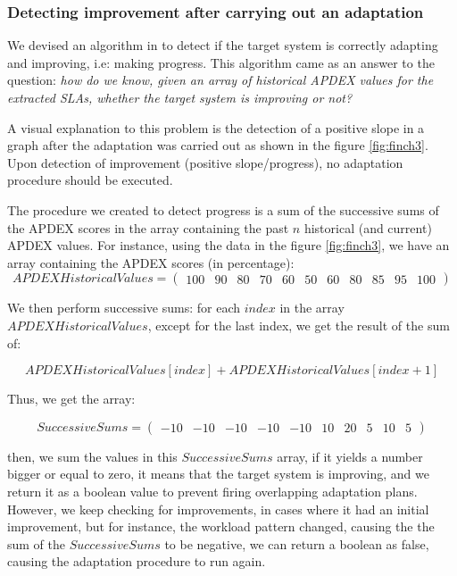\begin{appendices}
\subsubsection{Detecting improvement after carrying out an adaptation}

We devised an algorithm in \projectname{} to detect if the target system is correctly adapting and improving, i.e: making progress. This algorithm came as an answer to the question: \emph{how do we know, given an array of historical APDEX values for the extracted SLAs, whether the target system is improving or not?}

A visual explanation to this problem is the detection of a positive slope in a graph after the adaptation was carried out as shown in the figure \ref{fig:finch3}. Upon detection of improvement (positive slope/progress), no adaptation procedure should be executed. 

The procedure we created to detect progress is a sum of the successive sums of the APDEX scores in the array containing the past $n$ historical (and current) APDEX values. For instance, using the data in the figure \ref{fig:finch3}, we have an array containing the APDEX scores (in percentage):
\[
APDEXHistoricalValues = 
  \begin{pmatrix}100 & 90 & 80 & 70 & 60 & 50 & 60 & 80 & 85 & 95 & 100\end{pmatrix}
\]

We then perform successive sums: for each $index$ in the array $APDEXHistoricalValues$, except for the last index, we get the result of the sum of:

$$
APDEXHistoricalValues[index] + APDEXHistoricalValues[index + 1]
$$

Thus, we get the array:

\[
SuccessiveSums = 
  \begin{pmatrix}-10 & -10 & -10 & -10 & -10 & 10 & 20 & 5 & 10 & 5\end{pmatrix}
\]

then, we sum the values in this $SuccessiveSums$ array, if it yields a number bigger or equal to zero, it means that the target system is improving, and we return it as a boolean value to prevent firing overlapping adaptation plans. However, we keep checking for improvements, in cases where it had an initial improvement, but for instance, the workload pattern changed, causing the the sum of the $SuccessiveSums$ to be negative, we can return a boolean as false, causing the adaptation procedure to run again.


\end{appendices}
